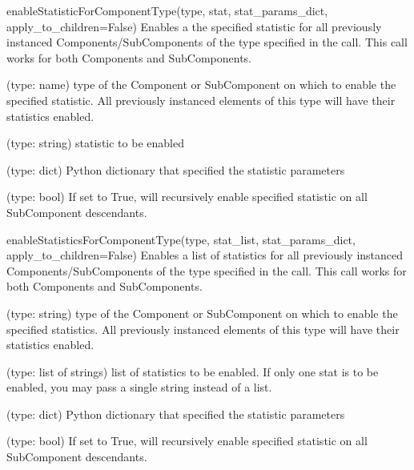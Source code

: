 \begin{functiondoc}{enableStatisticForComponentType(type, stat, stat_params_dict, apply_to_children=False)}{
    Enables a the specified statistic for all previously instanced
    Components/SubComponents of the type specified in the call.  This
    call works for both Components and SubComponents.
  }

   (type: name) type of the Component or SubComponent on
  which to enable the specified statistic.  All previously instanced
  elements of this type will have their statistics enabled.

   (type: string) statistic to be enabled

   (type: dict) Python dictionary that
  specified the statistic parameters

   (type: bool) If set to True, will
  recursively enable specified statistic on all SubComponent
  descendants.

  \noreturn
\end{functiondoc}


\begin{functiondoc}{enableStatisticsForComponentType(type, stat_list, stat_params_dict, apply_to_children=False)}{
    Enables a list of statistics for all previously instanced
    Components/SubComponents of the type specified in the call.  This
    call works for both Components and SubComponents.
}
    
   (type: string) type of the Component or SubComponent on
  which to enable the specified statistics.  All previously instanced
  elements of this type will have their statistics enabled.

   (type: list of strings) list of statistics to be
  enabled.  If only one stat is to be enabled, you may pass a single
  string instead of a list.

   (type: dict) Python dictionary that
  specified the statistic parameters

   (type: bool) If set to True, will
  recursively enable specified statistic on all SubComponent
  descendants.

  \noreturn
\end{functiondoc}


